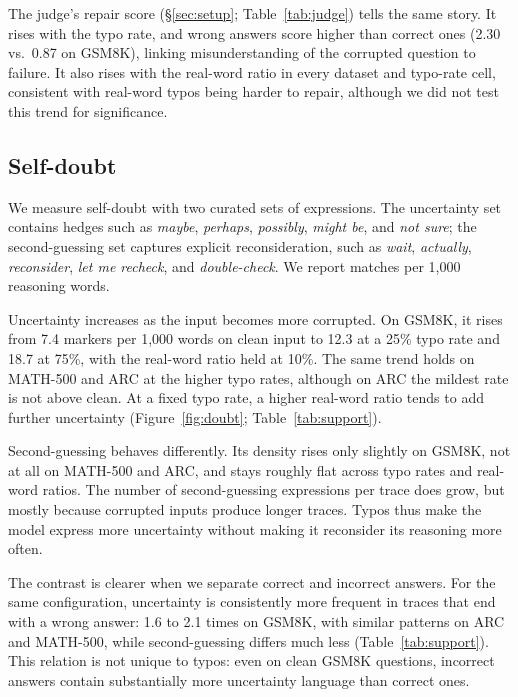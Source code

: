 \documentclass[11pt]{article}
\begin{document}
The judge's repair score (\S\ref{sec:setup}; Table~\ref{tab:judge}) tells the
same story. It rises with the typo rate, and wrong answers score higher than
correct ones (2.30 vs.\ 0.87 on GSM8K), linking misunderstanding of the
corrupted question to failure. It also rises with the real-word ratio in every
dataset and typo-rate cell, consistent with real-word typos being harder to
repair, although we did not test this trend for significance.

\subsection{Self-doubt}
\label{sec:doubt}

\begin{table}[t]
\centering
\footnotesize
\resizebox{\columnwidth}{!}{}
\caption{Mean LLM-judge scores over answered traces. \emph{repair} is the repair
score (0--5, higher means less of the intended meaning recovered); \emph{doubt}
is the self-doubt score (0--10, higher means more hesitation and looping).}
\label{tab:judge}
\end{table}

We measure self-doubt with two curated sets of expressions. The uncertainty set
contains hedges such as \emph{maybe}, \emph{perhaps}, \emph{possibly},
\emph{might be}, and \emph{not sure}; the second-guessing set captures explicit
reconsideration, such as \emph{wait}, \emph{actually}, \emph{reconsider},
\emph{let me recheck}, and \emph{double-check}. We report matches per 1,000
reasoning words.

Uncertainty increases as the input becomes more corrupted. On GSM8K, it rises
from 7.4 markers per 1,000 words on clean input to 12.3 at a 25\% typo rate and
18.7 at 75\%, with the real-word ratio held at 10\%. The same trend holds on
MATH-500 and ARC at the higher typo rates, although on ARC the mildest rate is
not above clean. At a fixed typo rate, a higher real-word ratio tends to add
further uncertainty (Figure~\ref{fig:doubt}; Table~\ref{tab:support}).

Second-guessing behaves differently. Its density rises only slightly on GSM8K,
not at all on MATH-500 and ARC, and stays roughly flat across typo rates and
real-word ratios. The number of second-guessing expressions per trace does grow,
but mostly because corrupted inputs produce longer traces. Typos thus make the
model express more uncertainty without making it reconsider its reasoning more
often.

The contrast is clearer when we separate correct and incorrect answers. For the
same configuration, uncertainty is consistently more frequent in traces that end
with a wrong answer: 1.6 to 2.1 times on GSM8K, with similar patterns on ARC and
MATH-500, while second-guessing differs much less (Table~\ref{tab:support}).
This relation is not unique to typos: even on clean GSM8K questions, incorrect
answers contain substantially more uncertainty language than correct ones.
\end{document}
